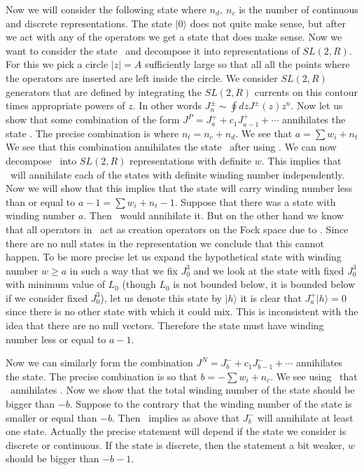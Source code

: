 Now we will consider the following state
\eqn{}
where $n_d,~n_c$ is the number of continuous and discrete representations.
The state $|0\rangle $ does not quite make sense, but after we act with
any of the operators we get a state that does make sense.
Now we want to consider the state \state\ and decompose it into
representations of $SL(2,R)$.
For this we pick a circle $|z| = A$ sufficiently large
so that all
all the points where the operators are inserted are
left inside the circle.
We consider
$SL(2,R)$ generators that are defined by integrating the $SL(2,R)$ currents on
this contour times appropriate powers of $z$. In other words
$J^\pm_n \sim \oint dz J^\pm (z) z^n$.
Now let us show that some combination of the form
$J^P = J^+_{a} + c_1 J^+_{a-1} + \cdots $
annihilates the state \state .
The precise combination is
\eqn{}
where $n_t = n_c + n_d$. We see that $a= \sum w_i + n_t $
We see that this  combination annihilates the state \state\
after using \condit . We can now decompose \state\ into
$SL(2,R)$ representations with definite $w$. This implies that
\precise\ will annihilate each of the states with definite
winding number independently.
Now we will show that this
implies that the state will carry winding
number less than or equal to $a-1 = \sum w_i + n_t -1$.
Suppose that there was  a state with winding number $a$. Then \precise\
would annihilate it. But on the other hand we know that all operators
in \precise\ act as creation operators on the Fock space due to \condit .
Since there are no null states in the representation we conclude that
this cannot happen. To be more precise let us expand the hypothetical
 state with winding
number $w\geq a$ in such a way that we fix $J_0^3$ and we look at the state
with fixed $J_0^3$ with minimum value of $L_0$ (though $L_0$ is not bounded
below, it is bounded below if we consider fixed $J_0^3$), let us denote
this state by $|h \rangle $ it is clear that $J^+_a |h \rangle =0$ since
there is no other state with which it could mix. This is inconsistent with
the idea that there are no null vectors. Therefore the state must have
winding number less or equal to $a-1$.


Now we can similarly form the combination
$J^N = J^-_b + c_1 J^-_{b-1} + \cdots $ annihilates the state.
The precise combination is
\eqn\negative{ J^N = \oint dz \prod_{i=1}^{n_d} (z-z_i)^{-w_i }
\prod_{j=1}^{n_c} (z-z_j)^{-w_j +1 } J^-(z)
}
so that $b = - \sum w_i + n_c $. We
see using \condit\ that \negative\
annihilates \state .
Now we show that the
total winding number of the state should be bigger than $-b$.
Suppose to the contrary that the winding number of the state is smaller
or equal than $-b$. Then \condit\ implies as above that $J_b^-$ will
annihilate at least one state. Actually the precise statement will
depend if the state we consider is discrete or continuous. If the state
is discrete, then the statement a bit weaker, $w$ should
be bigger than $-b - 1$.

